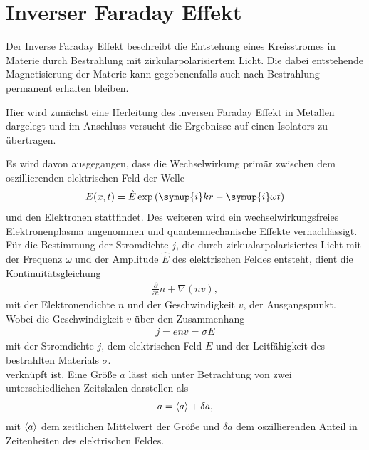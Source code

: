 \section{Inverser Faraday Effekt}
Der Inverse Faraday Effekt beschreibt die Entstehung eines Kreisstromes
in Materie durch Bestrahlung mit zirkularpolarisiertem Licht.
Die dabei entstehende Magnetisierung der Materie kann gegebenenfalls
auch nach Bestrahlung permanent erhalten bleiben.

Hier wird zunächst eine Herleitung des inversen Faraday Effekt in Metallen
dargelegt und im Anschluss versucht die Ergebnisse auf einen Isolators
zu übertragen.

Es wird davon ausgegangen, dass die Wechselwirkung primär zwischen dem
oszillierenden elektrischen Feld der Welle
\begin{align}
  E(x,t)=\hat{E}\exp{\left(\symup{i}kr-\symup{i}\omega t\right)}
\end{align}
und den Elektronen stattfindet.
Des weiteren wird ein wechselwirkungsfreies Elektronenplasma angenommen und quantenmechanische Effekte vernachlässigt.
Für die Bestimmung der Stromdichte $j$,
die durch zirkualarpolarisiertes Licht mit der Frequenz $\omega$ und
der Amplitude $\hat{E}$ des elektrischen Feldes entsteht, dient die Kontinuitätsgleichung
\begin{align}
  \frac{\partial}{\partial t}n +\nabla(nv), \label{eqn:konti}
\end{align}
mit der Elektronendichte $n$ und der Geschwindigkeit $v$,
der Ausgangspunkt.
Wobei die Geschwindigkeit $v$ über den Zusammenhang
\begin{align}
  j=env=\sigma E
\end{align}
mit der Stromdichte $j$, dem elektrischen Feld $E$ und
der Leitfähigkeit des bestrahlten Materials $\sigma$.\\
verknüpft ist.
Eine Größe $a$ lässt sich unter Betrachtung von zwei unterschiedlichen Zeitskalen darstellen als
\begin{align}
  a=\braket{a}+\delta a,
\end{align}
mit $\braket{a}$ dem zeitlichen Mittelwert der Größe und
$\delta a$ dem oszillierenden Anteil in Zeitenheiten des elektrischen Feldes.

